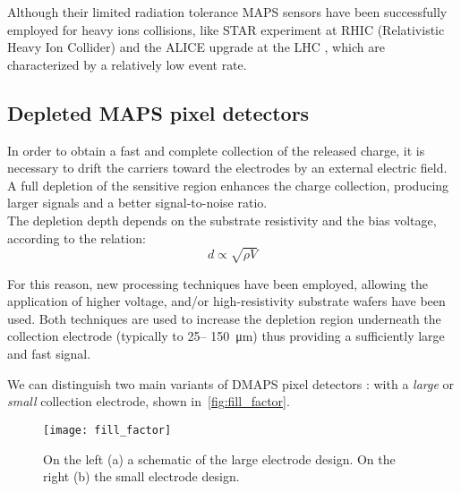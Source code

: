 Although their limited radiation tolerance MAPS sensors have been successfully employed for heavy ions collisions, like STAR experiment at RHIC (Relativistic Heavy Ion Collider) \cite{Greiner:2013tva} and the ALICE upgrade at the LHC \cite{ALICE:2013nwm}, which are characterized by a relatively low event rate.


\subsection{Depleted MAPS pixel detectors}

In order to obtain a fast and complete collection of the released charge, it is necessary to drift the carriers toward the electrodes by an external electric field. A full depletion of the sensitive region enhances the charge collection, producing larger signals and a better signal-to-noise ratio. \\
The depletion depth depends on the substrate resistivity and the bias voltage, according to the relation:
\medskip
\begin{equation}
d \propto \sqrt{\rho V}
\end{equation}

For this reason, new processing techniques have been employed, allowing the application of higher voltage, and/or high-resistivity substrate wafers have been used. Both techniques are used to increase the depletion region underneath the collection electrode (typically to 25– \SI{150}{\micro m}) thus providing a sufficiently large and fast signal.

We can distinguish two main variants of DMAPS pixel detectors \cite{Garcia-Sciveres:2017ymt}: with a \textit{large} or \textit{small} collection electrode, shown in~\autoref{fig:fill_factor}.

\begin{figure}[h!]
\centering
\texttt{[image: fill\_factor]}
\caption{On the left (a) a schematic of the large electrode design. On the right (b) the small electrode design.}
\label{fig:fill_factor}
\end{figure}

